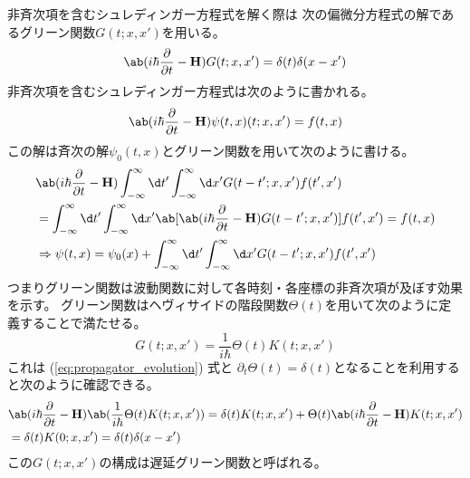 非斉次項を含むシュレディンガー方程式を解く際は
次の偏微分方程式の解であるグリーン関数$G(t;x,x')$を用いる。
\begin{equation}
  \label{eq:green_function_eq}
  \ab(i\hbar\pdv{}{t}-\vb{H})G(t;x,x')=\delta(t)\delta(x-x')
\end{equation}
非斉次項を含むシュレディンガー方程式は次のように書かれる。
\begin{equation}
  \ab(i\hbar\pdv{}{t}-\vb{H})\psi(t,x)(t;x,x')=f(t,x)
\end{equation}
この解は斉次の解$\psi_0(t,x)$とグリーン関数を用いて次のように書ける。
\begin{equation}
  \begin{split}
    &\ab(i\hbar\pdv{}{t}-\vb{H})
    \int_{-\infty}^\infty\d t'
    \int_{-\infty}^\infty\d x'
    G(t-t';x,x')f(t',x') \\
    &=\int_{-\infty}^\infty\d t'
    \int_{-\infty}^\infty\d x'
    \ab[\ab(i\hbar\pdv{}{t}-\vb{H})G(t-t';x,x')]f(t',x')
    =f(t,x) \\
    &\Rightarrow
    \psi(t,x)=\psi_0(x)+\int_{-\infty}^\infty\d t'
    \int_{-\infty}^\infty\d x'
    G(t-t';x,x')f(t',x')
  \end{split}
\end{equation}
つまりグリーン関数は波動関数に対して各時刻・各座標の非斉次項が及ぼす効果を示す。
グリーン関数はヘヴィサイドの階段関数$\Theta(t)$を用いて次のように定義することで満たせる。
\begin{equation}
  G(t;x,x')=\frac{1}{i\hbar}\Theta(t)K(t;x,x')
\end{equation}
これは (\ref{eq:propagator_evolution}) 式と
$\partial_t\Theta(t)=\delta(t)$となることを利用すると次のように確認できる。
\begin{equation}
  \begin{split}
    &\ab(i\hbar\pdv{}{t}-\vb{H})\ab(\frac{1}{i\hbar}\Theta(t)K(t;x,x'))
    =\delta(t)K(t;x,x')+\Theta(t)\ab(i\hbar\pdv{}{t}-\vb{H})K(t;x,x') \\
    &=\delta(t)K(0;x,x')=\delta(t)\delta(x-x')
  \end{split}
\end{equation}
この$G(t;x,x')$の構成は遅延グリーン関数と呼ばれる。

